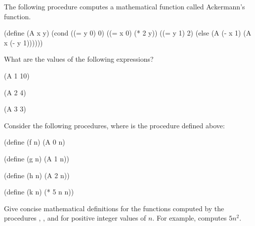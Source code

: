 \begin{exercise}
	\label{Exercise 1.10}
	The following procedure computes a mathematical function called Ackermann’s function.
	\begin{scheme}
	  (define (A x y)
	    (cond ((= y 0) 0)
	          ((= x 0) (* 2 y))
	          ((= y 1) 2)
	          (else (A (- x 1) (A x (- y 1))))))
	\end{scheme}
	What are the values of the following expressions?
	\begin{scheme}
	  (A 1 10)

	  (A 2 4)

	  (A 3 3)
	\end{scheme}
	Consider the following procedures, where  is the procedure defined above:
	\begin{scheme}
	  (define (f n) (A 0 n)

	  (define (g n) (A 1 n))

	  (define (h n) (A 2 n))

	  (define (k n) (* 5 n n))
	\end{scheme}
	Give concise mathematical definitions for the functions computed by the procedures , , and  for positive integer values of \( n \).
	For example,  computes \( 5 n^2 \).
\end{exercise}
